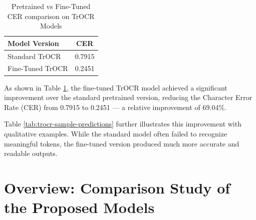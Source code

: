 \vspace{0.5cm}
\begin{table}[H]
\caption{Pretrained vs Fine-Tuned CER comparison on TrOCR Models}
\centering
\begin{tabular}{lc}
\hline
\textbf{Model Version} & \textbf{CER}  \\
\hline
Standard TrOCR & 0.7915 \\
Fine-Tuned TrOCR & 0.2451 \\
\hline
\end{tabular}

\label{tab:trocr-cer-comparison}
\end{table}


\vspace{0.5cm}
\begin{table}[H]
\caption{Sample Predictions: Standard vs. Fine-Tuned TrOCR}

\label{tab:trocr-sample-predictions}
\end{table}

As shown in Table \ref{tab:trocr-cer-comparison}, the fine-tuned TrOCR model achieved a significant improvement over the standard pretrained version, reducing the Character Error Rate (CER) from 0.7915 to 0.2451 — a relative improvement of 69.04\%. 

Table \ref{tab:trocr-sample-predictions} further illustrates this improvement with qualitative examples. While the standard model often failed to recognize meaningful tokens, the fine-tuned version produced much more accurate and readable outputs.

\section{Overview: Comparison Study of the Proposed Models}

